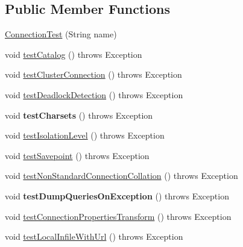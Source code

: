 \subsection*{Public Member Functions}
\begin{DoxyCompactItemize}
\item 
\mbox{\hyperlink{classtestsuite_1_1simple_1_1_connection_test_acee3750bd5fb78ce7006ff31f5740a48}{Connection\+Test}} (String name)
\item 
void \mbox{\hyperlink{classtestsuite_1_1simple_1_1_connection_test_a272c1a4280b551be2feb88f3995878b0}{test\+Catalog}} ()  throws Exception 
\item 
void \mbox{\hyperlink{classtestsuite_1_1simple_1_1_connection_test_a898cfadb7bf3141e3a364a0d47c824fc}{test\+Cluster\+Connection}} ()  throws Exception 
\item 
void \mbox{\hyperlink{classtestsuite_1_1simple_1_1_connection_test_afeddb6540162d5a3efe572d521dcc051}{test\+Deadlock\+Detection}} ()  throws Exception 
\item 
\mbox{\label{classtestsuite_1_1simple_1_1_connection_test_a50e876f57ca8519b368cead6c0dbf840}} 
void {\bfseries test\+Charsets} ()  throws Exception 
\item 
void \mbox{\hyperlink{classtestsuite_1_1simple_1_1_connection_test_a021e6d2e50117ac6af546f9f340e2127}{test\+Isolation\+Level}} ()  throws Exception 
\item 
void \mbox{\hyperlink{classtestsuite_1_1simple_1_1_connection_test_a999284ad25ed2dab4c2caa40dd551b51}{test\+Savepoint}} ()  throws Exception 
\item 
void \mbox{\hyperlink{classtestsuite_1_1simple_1_1_connection_test_a8965be404ac9488d5926ecd89eaeb919}{test\+Non\+Standard\+Connection\+Collation}} ()  throws Exception 
\item 
\mbox{\label{classtestsuite_1_1simple_1_1_connection_test_aa872b5f5448e7c9bfdcdc0db0efccda4}} 
void {\bfseries test\+Dump\+Queries\+On\+Exception} ()  throws Exception 
\item 
void \mbox{\hyperlink{classtestsuite_1_1simple_1_1_connection_test_a77b859fa3de7562ca295047776f563ee}{test\+Connection\+Properties\+Transform}} ()  throws Exception 
\item 
void \mbox{\hyperlink{classtestsuite_1_1simple_1_1_connection_test_aeb62fe06a5c144213319846e29ad17f5}{test\+Local\+Infile\+With\+Url}} ()  throws Exception 

\end{DoxyCompactItemize}
